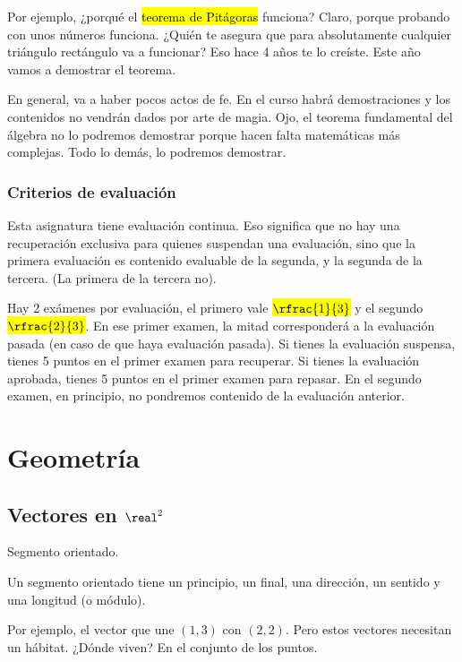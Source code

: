 \documentclass[palatino,nosec]{Docencia}
\begin{document}
Por ejemplo, ¿porqué el \hl{teorema de Pitágoras} funciona? 
%
Claro, porque probando con unos números funciona. 
%
¿Quién te asegura que para absolutamente cualquier triángulo rectángulo va a funcionar? Eso hace 4 años te lo creíste. 
%
Este año vamos a demostrar el teorema.

En general, va a haber pocos actos de fe. 
%
En el curso habrá demostraciones y los contenidos no vendrán dados por arte de magia. 
%
Ojo, el teorema fundamental del álgebra no lo podremos demostrar porque hacen falta matemáticas más complejas. 
%
Todo lo demás, lo podremos demostrar.

\subsection{Criterios de evaluación}

Esta asignatura tiene evaluación continua. Eso significa que no hay una recuperación exclusiva para quienes suspendan una evaluación, sino que la primera evaluación es contenido evaluable de la segunda, y la segunda de la tercera.
%
(La primera de la tercera no).

Hay 2 exámenes por evaluación, el primero vale \hl{$\rfrac{1}{3}$} y el segundo \hl{$\rfrac{2}{3}$}. 
%
En ese primer examen, la mitad corresponderá a la evaluación pasada (en caso de que haya evaluación pasada).
%
Si tienes la evaluación suspensa, tienes 5 puntos en el primer examen para recuperar.
%
Si tienes la evaluación aprobada, tienes 5 puntos en el primer examen para repasar.
%
En el segundo examen, en principio, no pondremos contenido de la evaluación anterior.




\chapter{Geometría}

\section{Vectores en $\real^2$}

\begin{defn}
Segmento orientado.
\end{defn}

\obs Un segmento orientado tiene un principio, un final, una dirección, un sentido y una longitud (o módulo).

Por ejemplo, el vector que une $(1,3)$ con $(2,2)$. Pero estos vectores necesitan un hábitat. ¿Dónde viven? En el conjunto de los puntos. 
\end{document}
